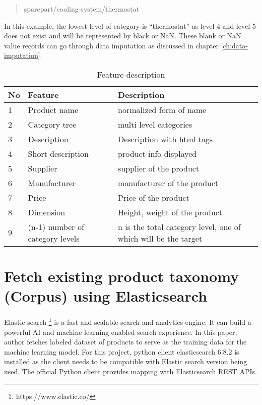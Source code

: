 \begin{quote} 
\centering 
sparepart/cooling-system/thermostat
\end{quote}
In this example, the lowest level of category is ``thermostat'' as level 4 and level 5 does not exist and will be represented by black or NaN. These blank or NaN value records can go through data imputation as discussed in chapter \ref{ch:data-imputation}.



\begin{table}[h]
      \centering
      \caption{Feature description}
      \label{table:feature_decription}
      \begin{tabular}{ lll }
            \toprule
            
            \textbf{No}& \textbf{Feature} & \textbf{Description}\\
            \midrule
            1&Product name & normalized form of name\\
            2&Category tree & multi level categories\\
            3&Description & Description with html tags\\         
            4&Short description  & product info displayed\\
            5&Supplier  &  supplier of the product\\
            6&Manufacturer  &  manufacturer of the product\\           
            7&Price  &  Price of the product\\
            8&Dimension  & Height, weight of the product\\
            9&(n-1) number of  category levels   &  n is the total category level, one of which will be the target\\
           
            \bottomrule
            \end{tabular}


\end{table}

\section {Fetch existing product taxonomy (Corpus) using Elasticsearch}
Elastic search \footnote{https://www.elastic.co/} is a fast and scalable search and analytics engine. It can build a powerful AI and machine learning enabled search experience. In this paper, author fetches labeled dataset of products to serve as the training data for the machine learning model.
For this project, python client elasticsearch 6.8.2 is installed as the client needs to be compatible with Elastic search version being used. The official Python client provides mapping with Elasticsearch REST APIs.

